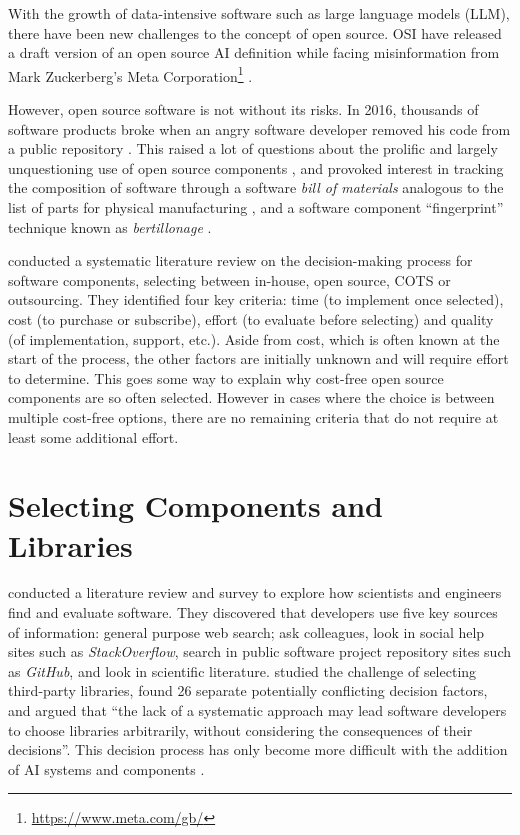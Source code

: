 With the growth of data-intensive software such as large language models (LLM), there have been new challenges to the concept of open source. OSI have released a draft version of an open source AI definition \citep{OpenSourceInitiative2024a} while facing misinformation from Mark Zuckerberg's Meta Corporation\footnote{\url{https://www.meta.com/gb/}} \citep{Rudra2024}.

However, open source software is not without its risks. In 2016, thousands of software products broke when an angry software developer removed his code from a public repository \citep{Williams2016}. This raised a lot of questions about the prolific and largely unquestioning use of open source components \citep{Abdalkareem2017}, and provoked interest in tracking the composition of software through a software \emph{bill of materials} analogous to the list of parts for physical manufacturing \citep{Stalnaker2023} \citep{Xia2023}, and a software component \enquote{fingerprint} technique known as \emph{bertillonage} \citep{Davies2013}.

\citet{Badampudi2016} conducted a systematic literature review on the decision-making process for software components, selecting between in-house, open source, COTS or outsourcing. They identified four key criteria: time (to implement once selected), cost (to purchase or subscribe), effort (to evaluate before selecting) and quality (of implementation, support, etc.). Aside from cost, which is often known at the start of the process, the other factors are initially unknown and will require effort to determine. This goes some way to explain why cost-free open source components are so often selected. However in cases where the choice is between multiple cost-free options, there are no remaining criteria that do not require at least some additional effort.

\section{Selecting Components and Libraries}
\label{literature:selection and comparison}

\citet{Hucka2018} conducted a literature review and survey to explore how scientists and engineers find and evaluate software. They discovered that developers use five key sources of information: general purpose web search; ask colleagues, look in social help sites such as \emph{StackOverflow}, search in public software project repository sites such as \emph{GitHub}, and look in scientific literature. \citet{LariosVargas2020} studied the challenge of selecting third-party libraries, found 26 separate potentially conflicting decision factors, and argued that \enquote{the lack of a systematic approach may lead software developers to choose libraries arbitrarily, without considering the consequences of their decisions}. This decision process has only become more difficult with the addition of AI systems and components \citep{Rani2025}.

